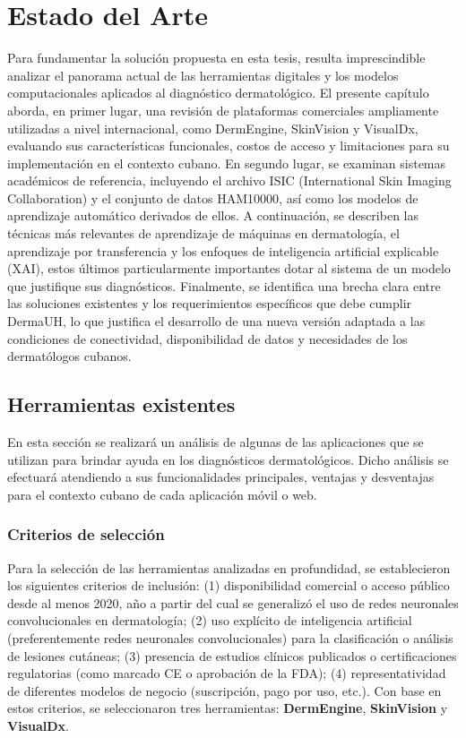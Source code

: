 \chapter{Estado del Arte}
Para fundamentar la solución propuesta en esta tesis, resulta imprescindible analizar el 
panorama actual de las herramientas digitales y los modelos computacionales aplicados al 
diagnóstico dermatológico. El presente capítulo aborda, en primer lugar, una revisión de 
plataformas comerciales ampliamente utilizadas a nivel internacional, como DermEngine, 
SkinVision y VisualDx, evaluando sus características funcionales, costos de acceso y 
limitaciones para su implementación en el contexto cubano. En segundo lugar, se examinan 
sistemas académicos de referencia, incluyendo el archivo ISIC (International Skin 
Imaging Collaboration) y el conjunto de datos HAM10000, así como los modelos de 
aprendizaje automático derivados de ellos. A continuación, se describen las técnicas 
más relevantes de aprendizaje de máquinas en dermatología, el aprendizaje por transferencia y los enfoques de 
inteligencia artificial explicable (XAI), estos últimos particularmente importantes 
dotar al sistema de un modelo que justifique sus diagnósticos. 
Finalmente, se identifica una brecha clara entre las soluciones existentes y los 
requerimientos específicos que debe cumplir DermaUH, lo que justifica el desarrollo 
de una nueva versión adaptada a las condiciones de conectividad, disponibilidad de datos 
y necesidades de los dermatólogos cubanos.

\section{Herramientas existentes}

En esta sección se realizará un análisis de algunas de las aplicaciones que se utilizan
para brindar ayuda en los diagnósticos dermatológicos. Dicho análisis se efectuará
atendiendo a sus funcionalidades principales, ventajas y desventajas para el contexto cubano de 
cada aplicación móvil o web.

\subsection*{Criterios de selección}
Para la selección de las herramientas analizadas en profundidad, se establecieron los siguientes 
criterios de inclusión: (1) disponibilidad comercial o acceso público desde al menos 2020,
año a partir del cual se generalizó el uso de redes neuronales convolucionales en dermatología; 
(2) uso explícito de inteligencia artificial (preferentemente redes neuronales convolucionales) 
para la clasificación o análisis de lesiones cutáneas; (3) presencia de estudios clínicos 
publicados o certificaciones regulatorias (como marcado CE o aprobación de la FDA); 
(4) representatividad de diferentes modelos de negocio (suscripción, pago por uso, etc.). 
Con base en estos criterios, se seleccionaron tres herramientas: \textbf{DermEngine}, 
\textbf{SkinVision} y \textbf{VisualDx}. 

